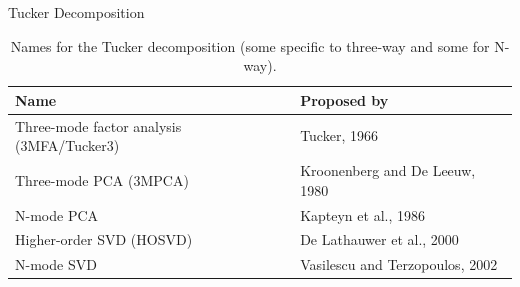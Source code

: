 \documentclass[t, 10pt, handout, aspectratio=169]{beamer}
\begin{document}

\begin{frame}{Tucker Decomposition}
\large
\begin{table}
\begin{tabular}{l | l}
Name & Proposed by \\
\hline \hline
Three-mode factor analysis (3MFA/Tucker3) & Tucker, 1966 \\ 
Three-mode PCA (3MPCA) &  Kroonenberg and De Leeuw, 1980\\
N-mode PCA & Kapteyn et al., 1986 \\
Higher-order SVD (HOSVD)  & De Lathauwer et al., 2000 \\
N-mode SVD & Vasilescu and Terzopoulos, 2002
\end{tabular}
\caption{Names for the Tucker decomposition (some specific to three-way and some for N-way).}
\end{table}
\end{frame}
\end{document}
